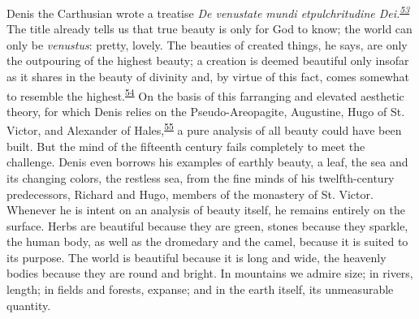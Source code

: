 Denis the Carthusian wrote a treatise \emph{De venustate mundi
etpulchritudine
Dei.\textsuperscript{\protect\hypertarget{20_ILLUSTRATIONS_FOLLOW_PAGE.xhtmlux5cux23id_367}{\protect\hyperlink{23_NOTES.xhtmlux5cux23id_368}{53}}}}
The title already tells us that true beauty is only for God to know; the
world can only be \emph{venustus}: pretty, lovely. The beauties of
created things, he says, are only the outpouring of the highest beauty;
a creation is deemed beautiful only insofar as it shares in the beauty
of divinity and, by virtue of this fact, comes somewhat to resemble the
highest.\textsuperscript{\protect\hypertarget{20_ILLUSTRATIONS_FOLLOW_PAGE.xhtmlux5cux23id_365}{\protect\hyperlink{23_NOTES.xhtmlux5cux23id_366}{54}}}
On the basis of this farranging and elevated aesthetic theory, for which
Denis relies on the Pseudo-Areopagite, Augustine, Hugo of St. Victor,
and Alexander of
Hales,\textsuperscript{\protect\hypertarget{20_ILLUSTRATIONS_FOLLOW_PAGE.xhtmlux5cux23id_363}{\protect\hyperlink{23_NOTES.xhtmlux5cux23id_364}{55}}}
a pure analysis of all beauty could have been built. But the mind of the
fifteenth century fails completely to meet the challenge. Denis even
borrows his examples of earthly beauty, a leaf, the sea and its changing
colors, the restless sea, from the fine minds of his twelfth-century
predecessors, Richard and Hugo, members of the monastery of St. Victor.
Whenever he is intent on an analysis of beauty itself, he remains
entirely on the surface. Herbs are beautiful because they are green,
stones because they sparkle, the human body, as well as the dromedary
and the camel, because it is suited to its purpose. The world is
beautiful because it is long and wide, the heavenly bodies because they
are round
\protect\hypertarget{20_ILLUSTRATIONS_FOLLOW_PAGE.xhtmlux5cux23page_322}{}{}and
bright. In mountains we admire size; in rivers, length; in fields and
forests, expanse; and in the earth itself, its unmeasurable quantity.

